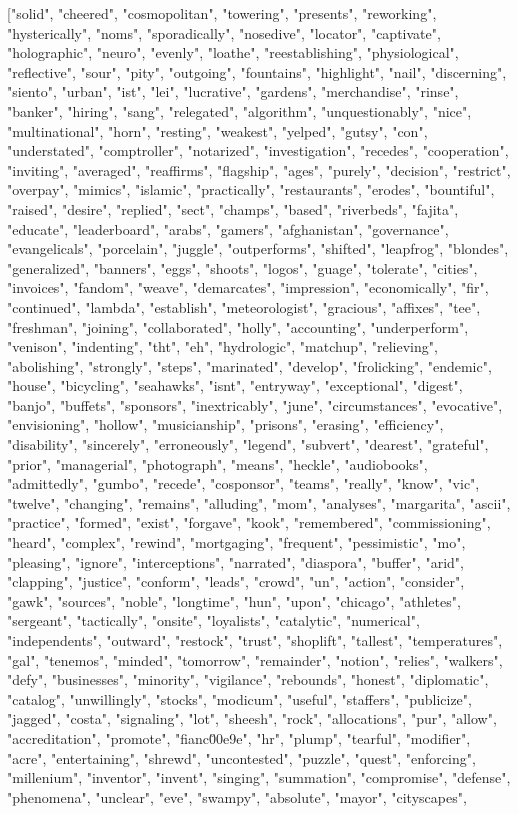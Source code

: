 ["solid", "cheered", "cosmopolitan", "towering", "presents", "reworking", "hysterically", "noms", "sporadically", "nosedive", "locator", "captivate", "holographic", "neuro", "evenly", "loathe", "reestablishing", "physiological", "reflective", "sour", "pity", "outgoing", "fountains", "highlight", "nail", "discerning", "siento", "urban", "ist", "lei", "lucrative", "gardens", "merchandise", "rinse", "banker", "hiring", "sang", "relegated", "algorithm", "unquestionably", "nice", "multinational", "horn", "resting", "weakest", "yelped", "gutsy", "con", "understated", "comptroller", "notarized", "investigation", "recedes", "cooperation", "inviting", "averaged", "reaffirms", "flagship", "ages", "purely", "decision", "restrict", "overpay", "mimics", "islamic", "practically", "restaurants", "erodes", "bountiful", "raised", "desire", "replied", "sect", "champs", "based", "riverbeds", "fajita", "educate", "leaderboard", "arabs", "gamers", "afghanistan", "governance", "evangelicals", "porcelain", "juggle", "outperforms", "shifted", "leapfrog", "blondes", "generalized", "banners", "eggs", "shoots", "logos", "guage", "tolerate", "cities", "invoices", "fandom", "weave", "demarcates", "impression", "economically", "fir", "continued", "lambda", "establish", "meteorologist", "gracious", "affixes", "tee", "freshman", "joining", "collaborated", "holly", "accounting", "underperform", "venison", "indenting", "tht", "eh", "hydrologic", "matchup", "relieving", "abolishing", "strongly", "steps", "marinated", "develop", "frolicking", "endemic", "house", "bicycling", "seahawks", "isnt", "entryway", "exceptional", "digest", "banjo", "buffets", "sponsors", "inextricably", "june", "circumstances", "evocative", "envisioning", "hollow", "musicianship", "prisons", "erasing", "efficiency", "disability", "sincerely", "erroneously", "legend", "subvert", "dearest", "grateful", "prior", "managerial", "photograph", "means", "heckle", "audiobooks", "admittedly", "gumbo", "recede", "cosponsor", "teams", "really", "know", "vic", "twelve", "changing", "remains", "alluding", "mom", "analyses", "margarita", "ascii", "practice", "formed", "exist", "forgave", "kook", "remembered", "commissioning", "heard", "complex", "rewind", "mortgaging", "frequent", "pessimistic", "mo", "pleasing", "ignore", "interceptions", "narrated", "diaspora", "buffer", "arid", "clapping", "justice", "conform", "leads", "crowd", "un", "action", "consider", "gawk", "sources", "noble", "longtime", "hun", "upon", "chicago", "athletes", "sergeant", "tactically", "onsite", "loyalists", "catalytic", "numerical", "independents", "outward", "restock", "trust", "shoplift", "tallest", "temperatures", "gal", "tenemos", "minded", "tomorrow", "remainder", "notion", "relies", "walkers", "defy", "businesses", "minority", "vigilance", "rebounds", "honest", "diplomatic", "catalog", "unwillingly", "stocks", "modicum", "useful", "staffers", "publicize", "jagged", "costa", "signaling", "lot", "sheesh", "rock", "allocations", "pur", "allow", "accreditation", "promote", "fianc\u00e9e", "hr", "plump", "tearful", "modifier", "acre", "entertaining", "shrewd", "uncontested", "puzzle", "quest", "enforcing", "millenium", "inventor", "invent", "singing", "summation", "compromise", "defense", "phenomena", "unclear", "eve", "swampy", "absolute", "mayor", "cityscapes", 